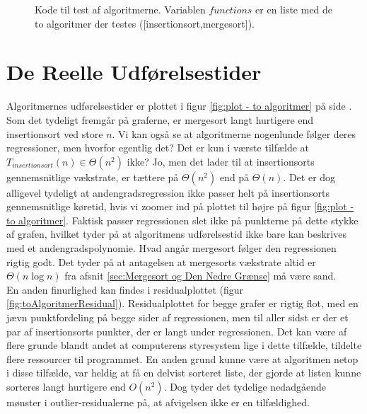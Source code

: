 \begin{figure}
	\begin{center}
		
	\end{center}
	\caption{Kode til test af algoritmerne. Variablen $functions$ er en liste med de to algoritmer der testes ([insertionsort,mergesort]).}
	\label{fig:Kode til test af algoritmerne}
\end{figure}



\section{De Reelle Udførelsestider}
\label{sec:De Reelle Køretider}

Algoritmernes udførelsestider er plottet i figur \ref{fig:plot - to algoritmer} på side \pageref{fig:plot - to algoritmer}.\\

Som det tydeligt fremgår på graferne, er mergesort langt hurtigere end insertionsort ved store $n$. Vi kan også se at algoritmerne nogenlunde følger deres regressioner, men hvorfor egentlig det? Det er kun i værste tilfælde at $T_{insertionsort}(n) \in \Theta (n^2)$ ikke? Jo, men det lader til at insertionsorts gennemsnitlige vækstrate, er tættere på $\Theta (n^2)$ end på $\Theta (n)$. Det er dog alligevel tydeligt at andengradsregression ikke passer helt på insertionsorts gennemsnitlige køretid, hvis vi zoomer ind på plottet til højre på figur \ref{fig:plot - to algoritmer}. Faktisk passer regressionen slet ikke på punkterne på dette stykke af grafen, hvilket tyder på at algoritmens udførelsestid ikke bare kan beskrives med et andengradspolynomie. Hvad angår mergesort følger den regressionen rigtig godt. Det tyder på at antagelsen at mergesorts vækstrate altid er $\Theta (n \log n)$ fra afsnit \ref{sec:Mergesort og Den Nedre Grænse} må være sand.\\

En anden finurlighed kan findes i residualplottet (figur \ref{fig:toAlgoritmerResidual}). Residualplottet for begge grafer er rigtig flot, med en jævn punktfordeling på begge sider af regressionen, men til aller sidst er der et par af insertionsorts punkter, der er langt under regressionen. Det kan være af flere grunde blandt andet at computerens styresystem lige i dette tilfælde, tildelte flere ressourcer til programmet. En anden grund kunne være at algoritmen netop i disse tilfælde, var heldig at få en delvist sorteret liste, der gjorde at listen kunne sorteres langt hurtigere end $O(n^2)$. Dog tyder det tydelige nedadgående mønster i outlier-residualerne på, at afvigelsen ikke er en tilfældighed.\\

